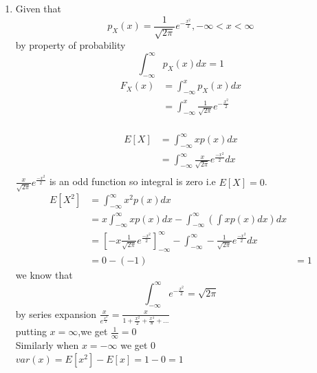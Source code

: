 \documentclass[journal,12pt,twocolumn]{IEEEtran}
\renewcommand\thesection{\arabic{section}}
\begin{document}
\begin{enumerate}[label=\thesection.\arabic*,ref=\thesection.\theenumi]
\item Given that 
$$p_X (x) = \frac{1}{\sqrt{2\pi}}e^{-\frac{x^2}{2}} ,-\infty <x< \infty$$
by property of probability $$\int_{-\infty} ^{\infty} p_X (x)dx = 1$$
\begin{align*}
    F_X (x) &= \int_{-\infty} ^{x} p_X (x) dx\\
     &=  \int_{-\infty} ^{x} \frac{1}{\sqrt{2\pi}}e^{-\frac{x^2}{2}} \\
\end{align*}

\begin{align*}
    E[X] &= \int_{-\infty} ^{\infty} xp(x) dx \\
    &= \int_{-\infty} ^{\infty} \frac{x}{\sqrt{2\pi}} e^{\frac{-x^2}{2}}dx \\
\end{align*}
$\frac{x}{\sqrt{2\pi}} e^{\frac{-x^2}{2}}$ is an odd function so integral is zero i.e $E[X] = 0$. \\

\begin{align*}
    E[X^2] &= \int_{-\infty}  ^{\infty} x^{2} p(x) dx \\
    &= x\int_{-\infty} ^{\infty} xp(x) dx - \int_{-\infty} ^{\infty} \left(\int xp(x) dx\right)dx\\
    &= \left[-x\frac{1}{\sqrt{2\pi}}e^{\frac{-x^2}{2}}\right]_{-\infty} ^{\infty} - \int_{-\infty} ^{\infty} -\frac{1}{\sqrt{2\pi}}e^{\frac{-x^2}{2}} dx  \\
    &= 0 - (-1)
    &= 1
\end{align*}
we know that
$$\int_{-\infty} ^{\infty} e^{-\frac{x^2}{2}} = \sqrt{2\pi}$$
by series expansion $\frac{x}{e^{\frac{x^2}{2}}} = \frac{x}{1 +\frac{x^2}{2} + \frac{x^4}{8} + ... }$ \\
putting $x = \infty$,we get $\frac{1}{\infty} = 0$ \\
Similarly when $x = -\infty$ we get 0 \\
$var(x) = E[x^2] - E[x] = 1 - 0 =1$
\end{enumerate}
\end{document}
